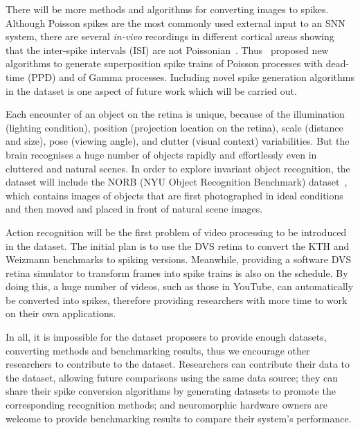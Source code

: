 There will be more methods and algorithms for converting images to spikes.
Although Poisson spikes are the most commonly used external input to an SNN system, there are several \textit{in-vivo} recordings in different cortical areas showing that the inter-spike intervals (ISI) are not Poissonian~\cite{deger2012statistical}. 
Thus~\cite{deger2012statistical} proposed new algorithms to generate superposition spike trains of Poisson processes with dead-time (PPD) and of Gamma processes.
Including novel spike generation algorithms in the dataset is one aspect of future work which will be carried out.

Each encounter of an object on the retina is unique, because of the illumination (lighting condition), position (projection location on the retina), scale (distance and size), pose (viewing angle), and clutter (visual context) variabilities.
But the brain recognises a huge number of objects rapidly and effortlessly even in cluttered and natural scenes.
In order to explore invariant object recognition, the dataset will include the NORB (NYU Object Recognition Benchmark) dataset~\cite{lecun2004learning}, which contains images of objects that are first photographed in ideal conditions and then moved and placed in front of natural scene images.

Action recognition will be the first problem of video processing to be introduced in the dataset.
The initial plan is to use the DVS retina to convert the KTH and Weizmann benchmarks to spiking versions.
Meanwhile, providing a software DVS retina simulator to transform frames into spike trains is also on the schedule.
By doing this, a huge number of videos, such as those in YouTube, can automatically be converted into spikes, therefore providing researchers with more time to work on their own applications.

In all, it is impossible for the dataset proposers to provide enough datasets, converting methods and benchmarking results, thus we encourage other researchers to contribute to the dataset.
Researchers can contribute their data to the dataset, allowing future comparisons using the same data source;
they can share their spike conversion algorithms by generating datasets to promote the corresponding recognition methods;
and neuromorphic hardware owners are welcome to provide benchmarking results to compare their system's performance.